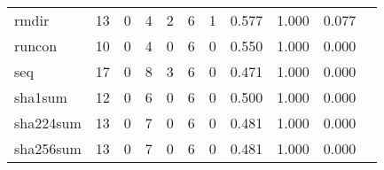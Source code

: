 \begin{longtable}{lp{1.2cm}p{1.2cm}p{1.2cm}p{1.2cm}p{1.2cm}p{1.2cm}p{1.2cm}p{1.2cm}p{1.2cm}p{1.2cm}}
rmdir     &                                    13 &                                                  0 &                                                  4 &                                                  2 &                                                  6 &                                                  1 &                                              0.577 &                                              1.000 &                                              0.077 \\
runcon    &                                    10 &                                                  0 &                                                  4 &                                                  0 &                                                  6 &                                                  0 &                                              0.550 &                                              1.000 &                                              0.000 \\
seq       &                                    17 &                                                  0 &                                                  8 &                                                  3 &                                                  6 &                                                  0 &                                              0.471 &                                              1.000 &                                              0.000 \\
sha1sum   &                                    12 &                                                  0 &                                                  6 &                                                  0 &                                                  6 &                                                  0 &                                              0.500 &                                              1.000 &                                              0.000 \\
sha224sum &                                    13 &                                                  0 &                                                  7 &                                                  0 &                                                  6 &                                                  0 &                                              0.481 &                                              1.000 &                                              0.000 \\
sha256sum &                                    13 &                                                  0 &                                                  7 &                                                  0 &                                                  6 &                                                  0 &                                              0.481 &                                              1.000 &                                              0.000 \\

\end{longtable}
